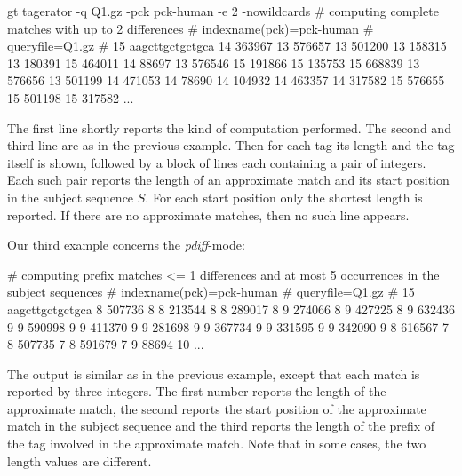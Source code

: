 \documentclass[12pt]{article}
\begin{document}
\begin{Output}
gt tagerator -q Q1.gz -pck pck-human -e 2 -nowildcards
# computing complete matches with up to 2 differences
# indexname(pck)=pck-human
# queryfile=Q1.gz
# 15 aagcttgctgctgca
14 363967
13 576657
13 501200
13 158315
13 180391
15 464011
14 88697
13 576546
15 191866
15 135753
15 668839
13 576656
13 501199
14 471053
14 78690
14 104932
14 463357
14 317582
15 576655
15 501198
15 317582
...
\end{Output}
The first line shortly reports the kind of computation performed. The second
and third line are as in the previous example. Then for
each tag its length and the tag itself is shown, followed by 
a block of lines each containing a pair of integers. Each such pair
reports the length of an approximate match and its start position in the
subject sequence \(S\). For each
start position only the shortest length is reported. If there are no
approximate matches, then no such line appears.

Our third example concerns the \textit{pdiff}-mode:

\begin{Output}
# computing prefix matches <= 1 differences and at most 5 occurrences in the subject sequences
# indexname(pck)=pck-human
# queryfile=Q1.gz
# 15 aagcttgctgctgca
8 507736 8
8 213544 8
8 289017 8
9 274066 8
9 427225 8
9 632436 9
9 590998 9
9 411370 9
9 281698 9
9 367734 9
9 331595 9
9 342090 9
8 616567 7
8 507735 7
8 591679 7
9 88694 10
...
\end{Output}

The output is similar as in the previous example, except that each match
is reported by three integers. The first number reports the length of the
approximate match, the second reports the start position of the approximate
match in the subject sequence and the third reports the length of the prefix 
of the tag involved in the approximate match. Note that in some cases,
the two length values are different.
\end{document}
